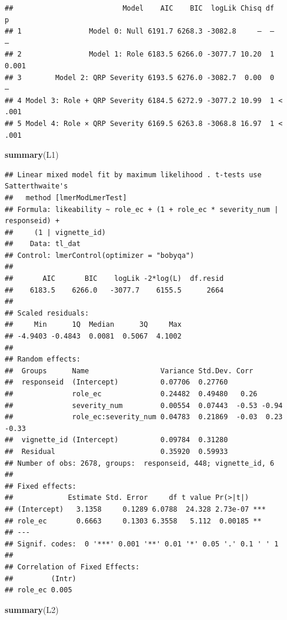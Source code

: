 \documentclass[
]{article}
\newenvironment{Shaded}{\begin{snugshade}}{\end{snugshade}}
\newcommand{\FunctionTok}[1]{\textcolor[rgb]{0.13,0.29,0.53}{\textbf{#1}}}
\newcommand{\NormalTok}[1]{#1}
\begin{document}
\begin{verbatim}
##                          Model    AIC    BIC  logLik Chisq df      p
## 1                Model 0: Null 6191.7 6268.3 -3082.8     —  —      —
## 2                Model 1: Role 6183.5 6266.0 -3077.7 10.20  1  0.001
## 3        Model 2: QRP Severity 6193.5 6276.0 -3082.7  0.00  0      —
## 4 Model 3: Role + QRP Severity 6184.5 6272.9 -3077.2 10.99  1 < .001
## 5 Model 4: Role × QRP Severity 6169.5 6263.8 -3068.8 16.97  1 < .001
\end{verbatim}

\begin{Shaded}
\begin{Highlighting}[]
\FunctionTok{summary}\NormalTok{(L1)}
\end{Highlighting}
\end{Shaded}

\begin{verbatim}
## Linear mixed model fit by maximum likelihood . t-tests use Satterthwaite's
##   method [lmerModLmerTest]
## Formula: likeability ~ role_ec + (1 + role_ec * severity_num | responseid) +  
##     (1 | vignette_id)
##    Data: tl_dat
## Control: lmerControl(optimizer = "bobyqa")
## 
##       AIC       BIC    logLik -2*log(L)  df.resid 
##    6183.5    6266.0   -3077.7    6155.5      2664 
## 
## Scaled residuals: 
##     Min      1Q  Median      3Q     Max 
## -4.9403 -0.4843  0.0081  0.5067  4.1002 
## 
## Random effects:
##  Groups      Name                 Variance Std.Dev. Corr             
##  responseid  (Intercept)          0.07706  0.27760                   
##              role_ec              0.24482  0.49480   0.26            
##              severity_num         0.00554  0.07443  -0.53 -0.94      
##              role_ec:severity_num 0.04783  0.21869  -0.03  0.23 -0.33
##  vignette_id (Intercept)          0.09784  0.31280                   
##  Residual                         0.35920  0.59933                   
## Number of obs: 2678, groups:  responseid, 448; vignette_id, 6
## 
## Fixed effects:
##             Estimate Std. Error     df t value Pr(>|t|)    
## (Intercept)   3.1358     0.1289 6.0788  24.328 2.73e-07 ***
## role_ec       0.6663     0.1303 6.3558   5.112  0.00185 ** 
## ---
## Signif. codes:  0 '***' 0.001 '**' 0.01 '*' 0.05 '.' 0.1 ' ' 1
## 
## Correlation of Fixed Effects:
##         (Intr)
## role_ec 0.005
\end{verbatim}

\begin{Shaded}
\begin{Highlighting}[]
\FunctionTok{summary}\NormalTok{(L2)}
\end{Highlighting}
\end{Shaded}
\end{document}

